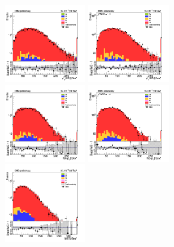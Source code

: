 \begin{figure}[tbp]
  \begin{center}
    \includegraphics[width=0.31\textwidth]{figures/mm_300_april18/hpt0_mm_CRTT_prefit_plot_apr18.png}
    \includegraphics[width=0.31\textwidth]{figures/mm_300_april18/hpt0_mm_CRTT_FullPostfit_plot_apr18.png}\\
    \includegraphics[width=0.31\textwidth]{figures/mm_300_april18/hpt1_mm_CRTT_prefit_plot_apr18.png}
    \includegraphics[width=0.31\textwidth]{figures/mm_300_april18/hpt1_mm_CRTT_FullPostfit_plot_apr18.png}\\
    \includegraphics[width=0.31\textwidth]{figures/mm_300_april18/met_pt_mm_CRTT_prefit_plot_apr18.png}

\end{center}
\end{figure}

